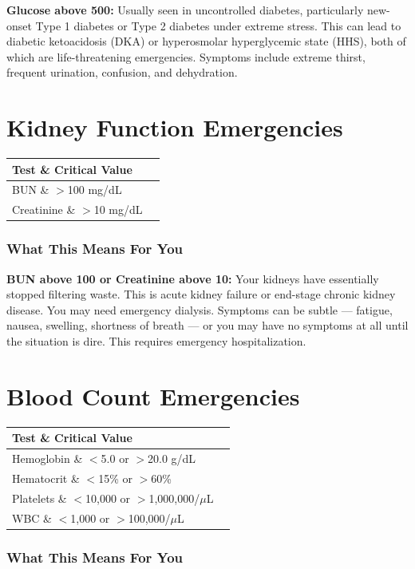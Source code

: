 \textbf{Glucose above 500:} Usually seen in uncontrolled diabetes, particularly new-onset Type 1 diabetes or Type 2 diabetes under extreme stress. This can lead to diabetic ketoacidosis (DKA) or hyperosmolar hyperglycemic state (HHS), both of which are life-threatening emergencies. Symptoms include extreme thirst, frequent urination, confusion, and dehydration.

\clearpage
\section{Kidney Function Emergencies}

\begin{longtable}{@{}ll@{}}
\toprule
\textbf{Test} \& \textbf{Critical Value} \\
\midrule
BUN \& $>$100 mg/dL \\
Creatinine \& $>$10 mg/dL \\
\bottomrule
\end{longtable}

\subsubsection{What This Means For You}

\textbf{BUN above 100 or Creatinine above 10:} Your kidneys have essentially stopped filtering waste. This is acute kidney failure or end-stage chronic kidney disease. You may need emergency dialysis. Symptoms can be subtle --- fatigue, nausea, swelling, shortness of breath --- or you may have no symptoms at all until the situation is dire. This requires emergency hospitalization.

\clearpage
\section{Blood Count Emergencies}

\begin{longtable}{@{}ll@{}}
\toprule
\textbf{Test} \& \textbf{Critical Value} \\
\midrule
Hemoglobin \& $<$5.0 or $>$20.0 g/dL \\
Hematocrit \& $<$15\% or $>$60\% \\
Platelets \& $<$10,000 or $>$1,000,000/$\mu$L \\
WBC \& $<$1,000 or $>$100,000/$\mu$L \\
\bottomrule
\end{longtable}

\subsubsection{What This Means For You}

